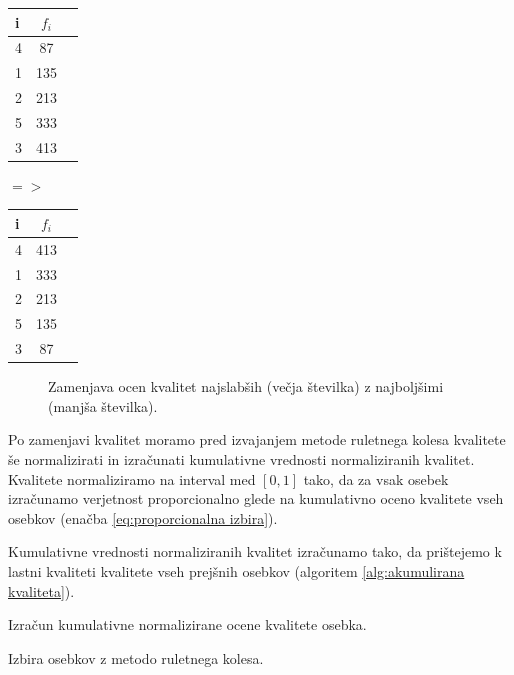 \documentclass[a4paper, 12pt]{book}
\begin{document}
\begin{table}
\begin{center}
\begin{tabular}{l | c | r}
i & $f_i$ \\
\hline
4 & 87 \\
1 & 135 \\
2 & 213 \\
5 & 333 \\
3 & 413 \\
\end{tabular}
\hspace{6mm} $=>$ \hspace{6mm}
\begin{tabular}{l | c | r}
i & $f_i$ \\
\hline
4 & 413 \\
1 & 333 \\
2 & 213 \\
5 & 135 \\
3 & 87 \\
\end{tabular}
\end{center}
\end{table}
\begin{figure}
\caption{Zamenjava ocen kvalitet najslab\v sih (ve\v cja \v stevilka) z najbolj\v simi (manj\v sa \v stevilka).}
\label{fig:zamenjava kvalitete}
\end{figure}

Po zamenjavi kvalitet moramo pred izvajanjem metode ruletnega kolesa kvalitete \v se normalizirati in izra\v cunati kumulativne vrednosti normaliziranih kvalitet. Kvalitete normaliziramo na interval med $[0, 1]$ tako, da za vsak osebek izra\v cunamo verjetnost proporcionalno glede na kumulativno oceno kvalitete vseh osebkov (ena\v cba  \ref{eq:proporcionalna izbira}).

Kumulativne vrednosti normaliziranih kvalitet izra\v cunamo tako, da pri\v stejemo k lastni kvaliteti kvalitete vseh prej\v snih osebkov (algoritem \ref{alg:akumulirana kvaliteta}).

\begin{algorithm}
\SetAlgoLined
{}
\caption{Izra\v cun kumulativne normalizirane ocene kvalitete osebka.}
\label{alg:akumulirana kvaliteta}
\end{algorithm}

\begin{algorithm}
\caption{Izbira osebkov z metodo ruletnega kolesa.}
\label{alg:ruletno kolo}
\end{algorithm}
\end{document}
